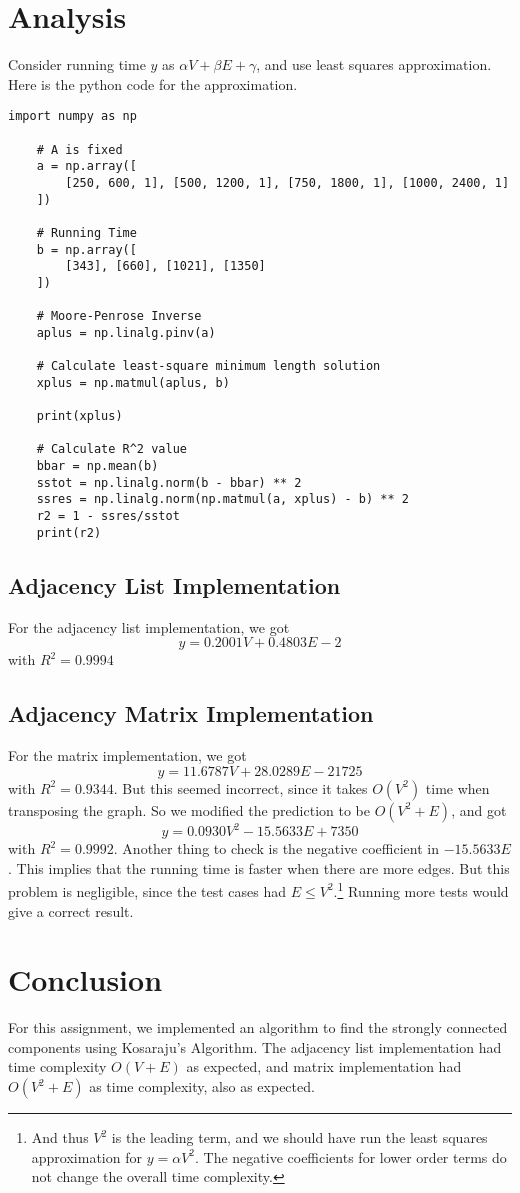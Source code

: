 \documentclass[12pt]{article}
\begin{document}
\section{Analysis}
Consider running time $y$ as $\alpha V + \beta E + \gamma$, and use least squares approximation.
Here is the python code for the approximation.
\begin{lstlisting}[style=Pystyle]
	import numpy as np
	
	# A is fixed
	a = np.array([
		[250, 600, 1], [500, 1200, 1], [750, 1800, 1], [1000, 2400, 1]
	])
	
	# Running Time
	b = np.array([
		[343], [660], [1021], [1350]
	])
	
	# Moore-Penrose Inverse
	aplus = np.linalg.pinv(a)
	
	# Calculate least-square minimum length solution
	xplus = np.matmul(aplus, b)
	
	print(xplus)
	
	# Calculate R^2 value
	bbar = np.mean(b)
	sstot = np.linalg.norm(b - bbar) ** 2
	ssres = np.linalg.norm(np.matmul(a, xplus) - b) ** 2
	r2 = 1 - ssres/sstot
	print(r2)
\end{lstlisting}

\subsection{Adjacency List Implementation}
For the adjacency list implementation, we got $$y = 0.2001 V + 0.4803 E - 2$$
with $R^2 =0.9994$
\subsection{Adjacency Matrix Implementation}
For the matrix implementation, we got $$y = 11.6787 V + 28.0289 E - 21725$$
with $R^2 = 0.9344$. But this seemed incorrect, since it takes $O(V^2)$ time when transposing the graph. So we modified the prediction to be $O(V^2+E)$, and got $$y = 0.0930 V^2 - 15.5633 E + 7350 $$ with $R^2 = 0.9992$. Another thing to check is the negative coefficient in $-15.5633E$. This implies that the running time is faster when there are more edges. But this problem is negligible, since the test cases had $E \leq V^2$.\footnote{And thus $V^2$ is the leading term, and we should have run the least squares approximation for $y = \alpha V^2$. The negative coefficients for lower order terms do not change the overall time complexity.} Running more tests would give a correct result. 

\section{Conclusion}
For this assignment, we implemented an algorithm to find the strongly connected components using Kosaraju's Algorithm. The adjacency list implementation had time complexity $O(V+E)$ as expected, and matrix implementation had $O(V^2+E)$ as time complexity, also as expected.
\end{document}
